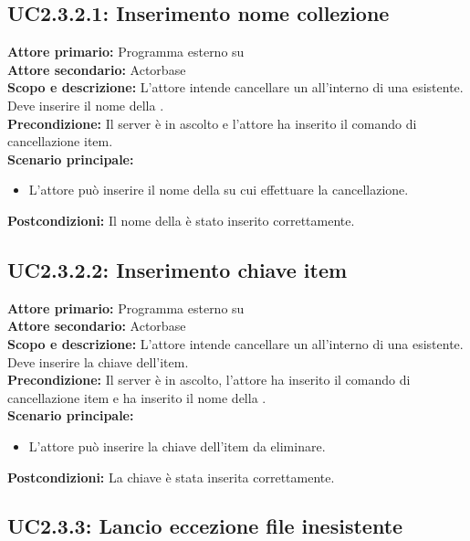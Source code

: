 \documentclass{scalatekids-article}
\begin{document}
\subsection{UC2.3.2.1: Inserimento nome collezione}

\textbf{Attore primario:} Programma esterno su \\
\textbf{Attore secondario:} Actorbase\\
\textbf{Scopo e descrizione:} L'attore intende cancellare un  all'interno di una  esistente. Deve inserire il nome della .\\
\textbf{Precondizione:} Il server è in ascolto e l'attore ha inserito il comando di cancellazione item.\\
\textbf{Scenario principale:}
\begin{itemize}
\item L'attore può inserire il nome della  su cui effettuare la cancellazione.
\end{itemize}
\textbf{Postcondizioni:} Il nome della  è stato inserito correttamente.

\subsection{UC2.3.2.2: Inserimento chiave item}

\textbf{Attore primario:} Programma esterno su \\
\textbf{Attore secondario:} Actorbase\\
\textbf{Scopo e descrizione:} L'attore intende cancellare un  all'interno di una  esistente. Deve inserire la chiave dell'item.\\
\textbf{Precondizione:} Il server è in ascolto, l'attore ha inserito il comando di cancellazione item e ha inserito il nome della .\\
\textbf{Scenario principale:}
\begin{itemize}
\item L'attore può inserire la chiave dell'item da eliminare.
\end{itemize}
\textbf{Postcondizioni:} La chiave è stata inserita correttamente.

\subsection{UC2.3.3: Lancio eccezione file inesistente}
\end{document}
